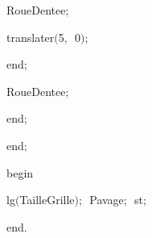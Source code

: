 {\vspace{\neglskip}\mbox{\blc  \blk\blk\blk\blk\blk\blk\idt  RoueDentee$;$}\par 
\vspace{\neglskip}\mbox{\blc  \blk\blk\blk\blk\blk\blk\idt  translater$($5$,$\ 0$)$$;$\ }\par 
\vspace{\neglskip}\mbox{\blc  \blk\blk\blk\blk\blk\idt  \mcl end\idt $;$}\par 
\vspace{\neglskip}\mbox{\blc  \blk\blk\blk\blk\idt  RoueDentee$;$}\par 
\vspace{\neglskip}\mbox{\blc  \blk\blk\blk\idt  \mcl end\idt $;$}\par 
\vspace{\neglskip}\mbox{\blc  \blk\idt  \mcl end\idt $;$}\par 
\medskip

\vspace{\neglskip}\mbox{\blc  \idt  \mcl begin\idt }\par 
\vspace{\neglskip}\mbox{\blc  \blk\idt  lg$($TailleGrille$)$$;$\ Pavage$;$\ st$;$}\par 
\vspace{\neglskip}\mbox{\blc  \idt  \mcl end\idt $.$}\par 

\medskip }


